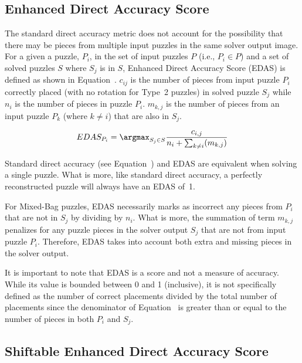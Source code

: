 \subsection{Enhanced Direct Accuracy Score}\label{sec:enhancedDirectAccuracyScore}

The standard direct accuracy metric does not account for the possibility that there may be pieces from multiple input puzzles in the same solver output image.  For a given a puzzle, $P_i$, in the set of input puzzles $P$ (i.e., $P_i \in P$) and a set of solved puzzles $S$ where $S_j$ is in $S$, Enhanced Direct Accuracy Score (EDAS) is defined as shown in Equation~.  $c_{ij}$ is the number of pieces from input puzzle $P_i$ correctly placed (with no rotation for Type~2 puzzles) in solved puzzle $S_j$ while $n_i$ is the number of pieces in puzzle $P_i$. $m_{k,j}$ is the number of pieces from an input puzzle $P_k$ (where $k \ne i$) that are also in $S_j$.

\begin{equation} \label{eq:enhancedDirectAccuracyScore}
EDAS_{P_i} = \argmax_{S_j \in S}\frac{c_{i,j}}{n_i + \sum_{k \ne i}(m_{k,j})}
\end{equation}

Standard direct accuracy (see Equation~) and EDAS are equivalent when solving a single puzzle. What is more, like standard direct accuracy, a perfectly reconstructed puzzle will always have an EDAS of~1. 

For Mixed-Bag puzzles, EDAS necessarily marks as incorrect any pieces from $P_i$ that are not in $S_j$ by dividing by $n_i$.  What is more, the summation of term $m_{k,j}$ penalizes for any puzzle pieces in the solver output $S_j$ that are not from input puzzle $P_i$.  Therefore, EDAS takes into account both extra and missing pieces in the solver output.

It is important to note that EDAS is a score and not a measure of accuracy. While its value is bounded between 0 and 1 (inclusive), it is not specifically defined as the number of correct placements divided by the total number of placements since the denominator of Equation~ is greater than or equal to the number of pieces in both $P_i$ and $S_j$.

\subsection{Shiftable Enhanced Direct Accuracy Score}\label{sec:shiftableEnhancedDirectAccuracy}

